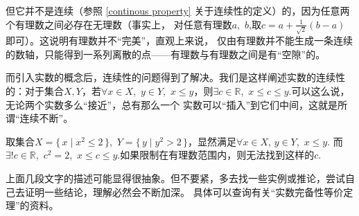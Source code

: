 但它并不是连续（参照 \autoref{continous property} 关于连续性的定义）的，因为任意两个有理数之间必存在无理数（事实上，
对任意有理数$a$,~$b$,取$c=a+\frac{1}{\sqrt{2}}(b-a)$即可）。这说明有理数并不“完美”，直观上来说，
仅由有理数并不能生成一条连续的数轴，只能得到一系列离散的点——有理数与有理数之间是有“空隙”的。


而引入实数的概念后，连续性的问题得到了解决。我们是这样阐述实数的连续性的：对于集合$X,Y$，若$\forall x\in X
$,~$y\in Y$,~$x\leqslant y$，则$\exists c\in \mathbb{R}$,~$x\leqslant c\leqslant y$.可以这么说，无论两个实数多么“接近”，总有那么一个
实数可以“插入”到它们中间，这就是所谓“连续不断”。
\begin{example}
    取集合$X=\{\, x\mid x^2\leqslant 2\,\}$,~$Y=\{\, y\mid y^2>2\,\}$，显然满足$\forall x\in X,\,y\in Y$,~$x\leqslant y$.
    而$\exists ! c\in \mathbb{R}$,~$c^2=2$,~$x\leqslant c\leqslant y$.如果限制在有理数范围内，则无法找到这样的$c$.
\end{example}


上面几段文字的描述可能显得很抽象。但不要紧，多去找一些实例或推论，尝试自己去证明一些结论，理解必然会不断加深。
具体可以查询有关“实数完备性等价定理”的资料。
